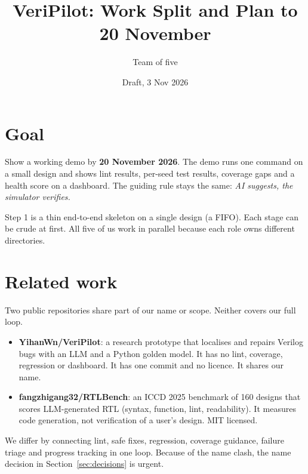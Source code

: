 \documentclass[11pt,a4paper]{article}
\title{VeriPilot: Work Split and Plan to 20 November}
\author{Team of five}
\date{Draft, 3 Nov 2026}
\begin{document}
\maketitle

\section{Goal}
Show a working demo by \textbf{20 November 2026}. The demo runs one command on a small design and shows lint results, per-seed test results, coverage gaps and a health score on a dashboard. The guiding rule stays the same: \emph{AI suggests, the simulator verifies.}

Step 1 is a thin end-to-end skeleton on a single design (a FIFO). Each stage can be crude at first. All five of us work in parallel because each role owns different directories.

\section{Related work}
Two public repositories share part of our name or scope. Neither covers our full loop.
\begin{itemize}[nosep]
  \item \textbf{YihanWn/VeriPilot}: a research prototype that localises and repairs Verilog bugs with an LLM and a Python golden model. It has no lint, coverage, regression or dashboard. It has one commit and no licence. It shares our name.
  \item \textbf{fangzhigang32/RTLBench}: an ICCD 2025 benchmark of 160 designs that scores LLM-generated RTL (syntax, function, lint, readability). It measures code generation, not verification of a user's design. MIT licensed.
\end{itemize}
We differ by connecting lint, safe fixes, regression, coverage guidance, failure triage and progress tracking in one loop. Because of the name clash, the name decision in Section~\ref{sec:decisions} is urgent.
\end{document}
